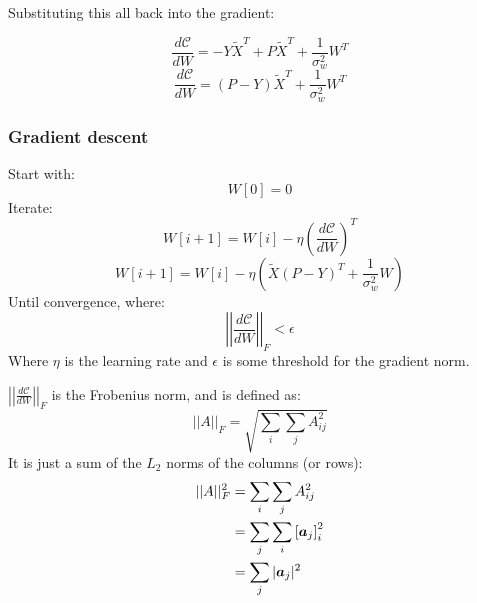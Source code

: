 \documentclass[../../main.tex]{subfiles}
\begin{document}
Substituting this all back into the gradient:

\[ \frac{d\mathcal{C}}{dW} = -Y\tilde{X}^T + P\tilde{X}^T + \frac{1}{\sigma_w^2}W^T \]
\[ \frac{d\mathcal{C}}{dW} = (P-Y)\tilde{X}^T + \frac{1}{\sigma_w^2}W^T \]

\subsubsection{Gradient descent}

Start with:
\[ W[0] = 0 \]
Iterate:
\[ W[i+1] = W[i] - \eta {\left(\frac{d\mathcal{C}}{dW}\right)}^T \]
\[ W[i+1] = W[i] - \eta\left(\tilde{X}{(P - Y)}^T + \frac{1}{\sigma_w^2}W\right)\]
Until convergence, where:
\[ {\left|\left|\frac{d\mathcal{C}}{dW}\right|\right|}_F < \epsilon \]
Where $\eta$ is the learning rate and $\epsilon$ is some threshold for the gradient norm.

${\left|\left|\frac{d\mathcal{C}}{dW}\right|\right|}_F$ is the Frobenius norm, and is defined as:
\[ ||A||_F = \sqrt{\sum_i\sum_j A_{ij}^2} \]
It is just a sum of the $L_2$ norms of the columns (or rows):
\begin{align*}
||A||_F^2 &= \sum_i\sum_j A_{ij}^2 \\
          &= \sum_j \sum_i {[\bm{a}_j]}_i^2 \\
          &= \sum_j |\bm{a}_j|^2 \\
\end{align*}
\end{document}

